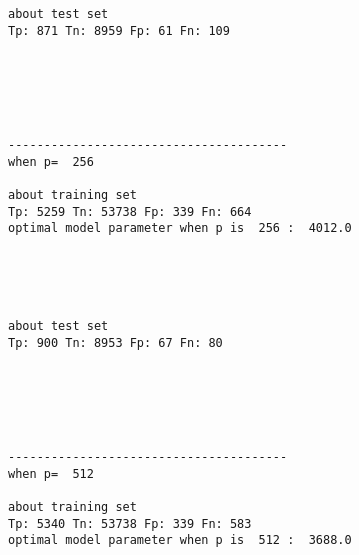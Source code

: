 \documentclass[11pt]{article}
\begin{document}
    \begin{Verbatim}[commandchars=\\\{\}]


about test set
Tp: 871 Tn: 8959 Fp: 61 Fn: 109

    \end{Verbatim}

    \begin{center}
    \end{center}
    { \hspace*{\fill} \\}
    
    \begin{Verbatim}[commandchars=\\\{\}]



---------------------------------------
when p=  256

about training set
Tp: 5259 Tn: 53738 Fp: 339 Fn: 664
optimal model parameter when p is  256 :  4012.0

    \end{Verbatim}

    \begin{center}
    \end{center}
    { \hspace*{\fill} \\}
    
    \begin{Verbatim}[commandchars=\\\{\}]


about test set
Tp: 900 Tn: 8953 Fp: 67 Fn: 80

    \end{Verbatim}

    \begin{center}
    \end{center}
    { \hspace*{\fill} \\}
    
    \begin{Verbatim}[commandchars=\\\{\}]



---------------------------------------
when p=  512

about training set
Tp: 5340 Tn: 53738 Fp: 339 Fn: 583
optimal model parameter when p is  512 :  3688.0

    \end{Verbatim}
\end{document}

